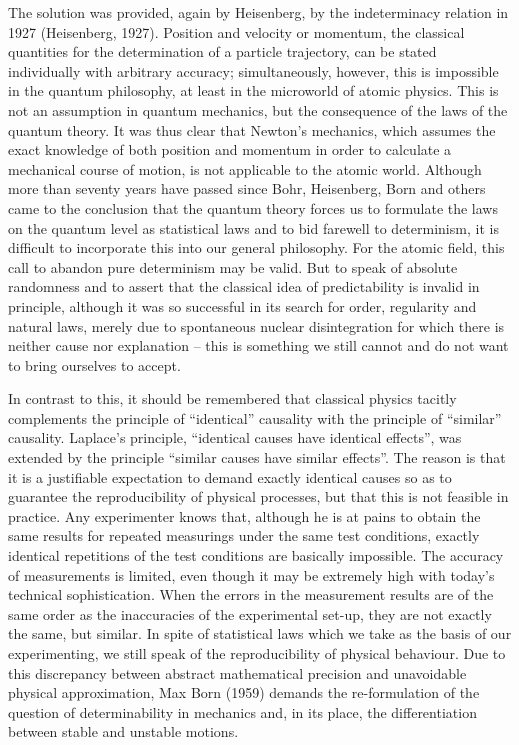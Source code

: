 \documentclass[12pt]{article}
\begin{document}
\hfill

The solution was provided, again by Heisenberg, by the indeterminacy relation in
1927 (Heisenberg, 1927). Position and velocity or momentum, the classical quantities
for the determination of a particle trajectory, can be stated individually with
arbitrary accuracy; simultaneously, however, this is impossible in the quantum philosophy, at least in the microworld of 
atomic physics. This is not an assumption
in quantum mechanics, but the consequence of the laws of the quantum theory.
It was thus clear that Newton’s mechanics, which assumes the exact knowledge of
both position and momentum in order to calculate a mechanical course of motion, is
not applicable to the atomic world. Although more than seventy years have passed
since Bohr, Heisenberg, Born and others came to the conclusion that the quantum
theory forces us to formulate the laws on the quantum level as statistical laws and
to bid farewell to determinism, it is difficult to incorporate this into our general
philosophy. For the atomic field, this call to abandon pure determinism may be
valid. But to speak of absolute randomness and to assert that the classical idea of
predictability is invalid in principle, although it was so successful in its search for
order, regularity and natural laws, merely due to spontaneous nuclear disintegration
for which there is neither cause nor explanation – this is something we still
cannot and do not want to bring ourselves to accept.

\hfill

In contrast to this, it should be remembered that classical physics tacitly complements
the principle of “identical” causality with the principle of “similar” causality.
Laplace’s principle, “identical causes have identical effects”, was extended by the
principle “similar causes have similar effects”. The reason is that it is a justifiable
expectation to demand exactly identical causes so as to guarantee the reproducibility
of physical processes, but that this is not feasible in practice. Any experimenter
knows that, although he is at pains to obtain the same results for repeated measurings
under the same test conditions, exactly identical repetitions of the test
conditions are basically impossible. The accuracy of measurements is limited, even
though it may be extremely high with today’s technical sophistication. When the
errors in the measurement results are of the same order as the inaccuracies of the
experimental set-up, they are not exactly the same, but similar. In spite of statistical
laws which we take as the basis of our experimenting, we still speak of the
reproducibility of physical behaviour. Due to this discrepancy between abstract
mathematical precision and unavoidable physical approximation, Max Born (1959)
demands the re-formulation of the question of determinability in mechanics and, in
its place, the differentiation between stable and unstable motions.
\end{document}
